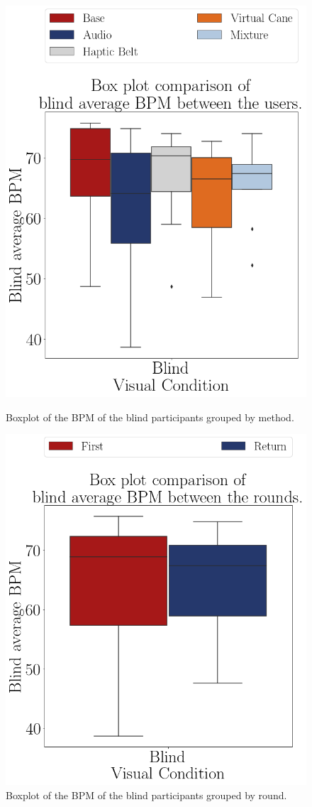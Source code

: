 \begin{figure}[!htb]
    \centering
    \begin{minipage}{0.45\textwidth}
        \centering
        \includegraphics[width = 0.8\linewidth]{Resultados/ECG/Figuras/png/boxplot_ecg_bpm_blind_scene.png}
        \caption{Boxplot of the BPM of the blind participants grouped by method.}
        \label{fig:boxplot_ecg_bpm_blind_scene}
    \end{minipage}
    \begin{minipage}{0.45\textwidth}
        \centering
        \includegraphics[width = 0.8\linewidth]{Resultados/ECG/Figuras/png/boxplot_ecg_bpm_blind_rounds.png}
        \caption{Boxplot of the BPM of the blind participants grouped by round.}
        \label{fig:boxplot_ecg_bpm_blind_rounds}
    \end{minipage}
\end{figure}

